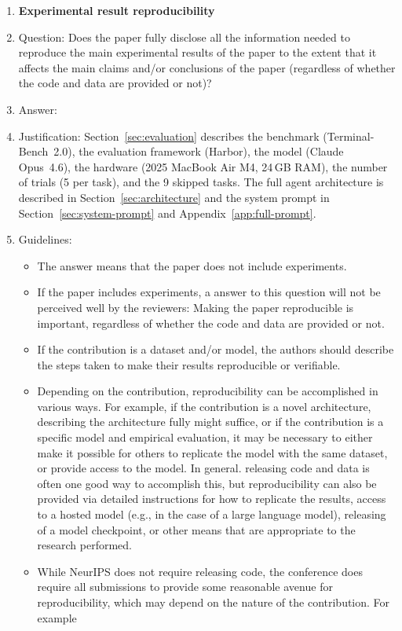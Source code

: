 \documentclass{article}
\begin{document}
\begin{enumerate}
    \item {\bf Experimental result reproducibility}
    \item[] Question: Does the paper fully disclose all the information needed to reproduce the main experimental results of the paper to the extent that it affects the main claims and/or conclusions of the paper (regardless of whether the code and data are provided or not)?
    \item[] Answer: \answerYes{}
    \item[] Justification: Section~\ref{sec:evaluation} describes the benchmark (Terminal-Bench~2.0), the evaluation framework (Harbor), the model (Claude Opus~4.6), the hardware (2025 MacBook Air M4, 24\,GB RAM), the number of trials (5 per task), and the 9 skipped tasks. The full agent architecture is described in Section~\ref{sec:architecture} and the system prompt in Section~\ref{sec:system-prompt} and Appendix~\ref{app:full-prompt}.
    \item[] Guidelines:
    \begin{itemize}
        \item The answer \answerNA{} means that the paper does not include experiments.
        \item If the paper includes experiments, a \answerNo{} answer to this question will not be perceived well by the reviewers: Making the paper reproducible is important, regardless of whether the code and data are provided or not.
        \item If the contribution is a dataset and/or model, the authors should describe the steps taken to make their results reproducible or verifiable. 
        \item Depending on the contribution, reproducibility can be accomplished in various ways. For example, if the contribution is a novel architecture, describing the architecture fully might suffice, or if the contribution is a specific model and empirical evaluation, it may be necessary to either make it possible for others to replicate the model with the same dataset, or provide access to the model. In general. releasing code and data is often one good way to accomplish this, but reproducibility can also be provided via detailed instructions for how to replicate the results, access to a hosted model (e.g., in the case of a large language model), releasing of a model checkpoint, or other means that are appropriate to the research performed.
        \item While NeurIPS does not require releasing code, the conference does require all submissions to provide some reasonable avenue for reproducibility, which may depend on the nature of the contribution. For example

\end{itemize}
\end{enumerate}
\end{document}
